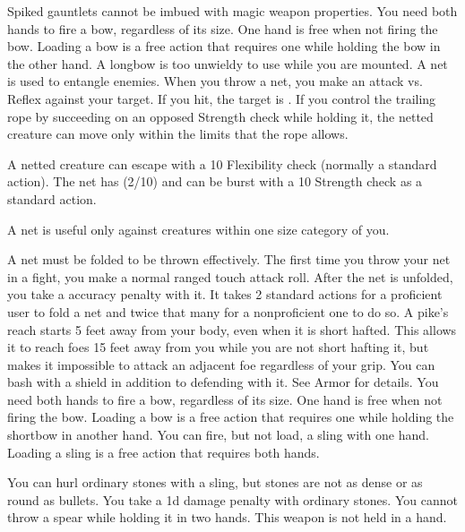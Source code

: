          Spiked gauntlets cannot be imbued with magic weapon properties.
         You need both hands to fire a bow, regardless of its size. One hand is free when not firing the bow. Loading a bow is a free action that requires one  while holding the bow in the other hand. A longbow is too unwieldy to use while you are mounted.
         A net is used to entangle enemies. When you throw a net, you make an attack vs. Reflex against your target. If you hit, the target is \slowed. If you control the trailing rope by succeeding on an opposed Strength check while holding it, the netted creature can move only within the limits that the rope allows.
        \par A netted creature can escape with a  10 Flexibility check (normally a standard action). The net has (2/10) and can be burst with a  10 Strength check as a standard action.
        \par A net is useful only against creatures within one size category of you.
        \par A net must be folded to be thrown effectively. The first time you throw your net in a fight, you make a normal ranged touch attack roll. After the net is unfolded, you take a  accuracy penalty with it. It takes 2 standard actions for a proficient user to fold a net and twice that many for a nonproficient one to do so.
         A pike's reach starts 5 feet away from your body, even when it is short hafted.
        This allows it to reach foes 15 feet away from you while you are not short hafting it, but makes it impossible to attack an adjacent foe regardless of your grip.
         You can bash with a shield in addition to defending with it. See Armor for details.
         You need both hands to fire a bow, regardless of its size. One hand is free when not firing the bow. Loading a bow is a free action that requires one  while holding the shortbow in another hand.
         You can fire, but not load, a sling with one hand. Loading a sling is a free action that requires both hands.
        \par You can hurl ordinary stones with a sling, but stones are not as dense or as round as bullets. You take a \minus1d damage penalty with ordinary stones.
         You cannot throw a spear while holding it in two hands.
         This weapon is not held in a hand.
